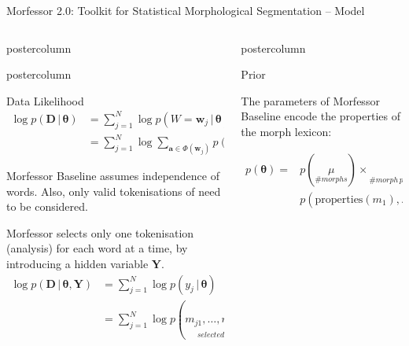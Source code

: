 \documentclass[final]{beamer} %
\newcommand{\mat}[1]{\mathbf{#1}}
\newcommand{\seq}[1]{\boldsymbol{#1}}
\newcommand{\txt}[1]{\textrm{#1}}
\newcommand{\len}[1]{\lvert#1\rvert}
\newcommand{\params}{\boldsymbol{\theta}}
\newcommand{\data}{\seq{D}}
\newcommand{\grammar}{\mathcal{G}}
\newcommand{\lexicon}{\mathcal{L}}
\newcommand{\tokenset}{\Phi}
\newcommand{\bound}{\#}
\newcommand{\vb}{\,|\,}
\newcommand{\Y}{\mat{Y}}
\begin{document}
\begin{frame}{Morfessor 2.0: Toolkit for Statistical Morphological Segmentation -- Model}
\begin{columns}
\begin{column}{.3\textwidth}
\begin{beamercolorbox}[center,wd=\textwidth]{postercolumn}
	\end{beamercolorbox}

      \begin{beamercolorbox}[center,wd=\textwidth]{postercolumn}
 \begin{block}{Data Likelihood}
\begin{align*}
  \log p(\data \vb \params)
  & = \sum_{j=1}^{N} \log p(W=\seq{w}_j \vb \params) \nonumber \\
  & = \sum_{j=1}^{N} \log \sum_{\seq{a} \in \tokenset(\seq{w}_j)}
  p(A=\seq{a} \vb \params),
\end{align*}

Morfessor Baseline assumes independence of words. Also, only valid tokenisations of need to be considered.

Morfessor selects only one tokenisation (analysis) for each word at a time, by introducing a hidden variable $\Y$. 
\begin{align*}
  \log p(\data \vb \params, \Y)
  & = \sum_{j=1}^{N} \log 
  p(y_j \vb \params) 
  \\&= \sum_{j=1}^{N} \log 
  p(\underset{selected\,analysis}{m_{j1}, \ldots, m_{j\len{\seq{y}_j}}, \bound_w} \vb \params) 
\label{eq:morphylikelihood}
\end{align*}

            \end{block}
	\end{beamercolorbox}




\end{column}

\begin{column}{.4\textwidth}


      \begin{beamercolorbox}[center,wd=\textwidth]{postercolumn}
 \begin{block}{Prior}

The parameters of Morfessor Baseline encode the properties of the morph lexicon:

\begin{align*}
p(\params)  =& p(\underset{\#morphs}{\mu}) \times \underset{\#morph\,permutations}{\mu!} \times\\& p(\txt{properties}(m_1), \ldots, \txt{properties}(m_{\mu}))  .
\end{align*}


\end{block}
\end{beamercolorbox}
\end{column}
\end{columns}
\end{frame}
\end{document}
